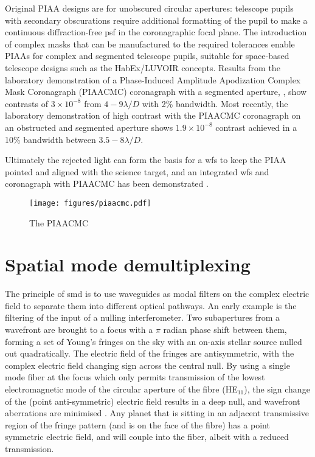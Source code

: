 \documentclass[letterpaper]{ar-1col}
\newcommand{\ld}{$\lambda/D$}
\begin{document}
%
Original PIAA designs are for unobscured circular apertures: telescope pupils with secondary obscurations require additional formatting of the pupil to make a continuous diffraction-free \ac{psf} in the coronagraphic focal plane.
%
The introduction of complex masks that can be manufactured to the required tolerances enable PIAAs for complex and segmented telescope pupils, suitable for space-based telescope designs such as the HabEx/LUVOIR concepts.
%
Results from the laboratory demonstration of a Phase-Induced Amplitude Apodization Complex Mask Coronagraph (PIAACMC) coronagraph with a segmented aperture, \citep{Marx21}, show contrasts of $3\times 10^{-8}$ from $4-9$\ld{} with 2\% bandwidth.
%
Most recently, the laboratory demonstration of high contrast with the PIAACMC coronagraph on an obstructed and segmented aperture \citep{Belikov22} shows $1.9\times 10^{-8}$ contrast achieved in a 10\% bandwidth between $3.5-8$\ld{}.

Ultimately the rejected light can form the basis for a \ac{wfs} to keep the PIAA pointed and aligned with the science target, and an integrated \ac{wfs} and coronagraph with PIAACMC has been demonstrated \citep{Haffert23a}.

\begin{figure}[ht]
  \centering
  \texttt{[image: figures/piaacmc.pdf]}
  \caption{The PIAACMC}
  \label{fig:coro_piaacmc}
\end{figure}

\section{Spatial mode demultiplexing}

The principle of \ac{smd} is to use waveguides as modal filters on the complex electric field to separate them into different optical pathways.
%
An early example is the filtering of the input of a nulling interferometer.
%
Two subapertures from a wavefront are brought to a focus with a $\pi$ radian phase shift between them, forming a set of Young's fringes on the sky with an on-axis stellar source nulled out quadratically.
%
The electric field of the fringes are antisymmetric, with the complex electric field changing sign across the central null.
%
By using a single mode fiber at the focus  which only permits transmission of the lowest electromagnetic mode of the circular aperture of the fibre (HE$_{11}$), the sign change of the (point anti-symmetric) electric field results in a deep null, and wavefront aberrations are minimised \citet{Serabyn06,Haguenauer06}.
%
Any planet that is sitting in an adjacent transmissive region of the fringe pattern (and is on the face of the fibre) has a point symmetric electric field, and will couple into the fiber, albeit with a reduced transmission.
\end{document}
